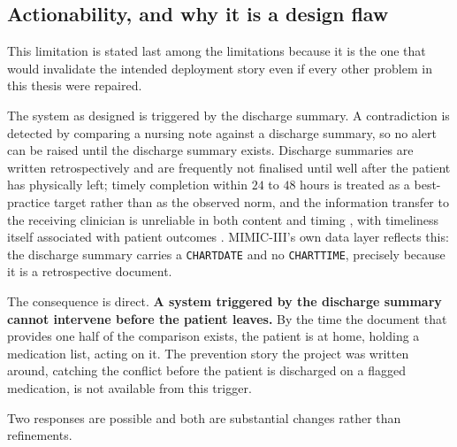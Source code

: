 \subsection{Actionability, and why it is a design flaw}
\label{sec:disc-actionability}

This limitation is stated last among the limitations because it is the one that
would invalidate the intended deployment story even if every other problem in
this thesis were repaired.

The system as designed is triggered by the discharge summary. A contradiction is
detected by comparing a nursing note against a discharge summary, so no alert
can be raised until the discharge summary exists. Discharge summaries are
written retrospectively and are frequently not finalised until well after the
patient has physically left; timely completion within $24$ to $48$ hours is
treated as a best-practice target rather than as the observed norm, and the
information transfer to the receiving clinician is unreliable in both content
and timing \citep{kripalani2007deficits}, with timeliness itself associated with
patient outcomes \citep{li2013timeliness}. MIMIC-III's own data layer reflects
this: the discharge summary carries a \texttt{CHARTDATE} and no
\texttt{CHARTTIME}, precisely because it is a retrospective document.

The consequence is direct. \textbf{A system triggered by the discharge summary
cannot intervene before the patient leaves.} By the time the document that
provides one half of the comparison exists, the patient is at home, holding a
medication list, acting on it. The prevention story the project was written
around, catching the conflict before the patient is discharged on a flagged
medication, is not available from this trigger.

Two responses are possible and both are substantial changes rather than
refinements.

